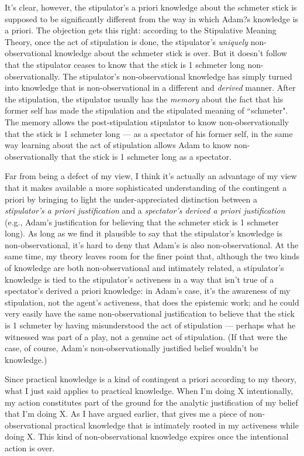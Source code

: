 \documentclass[a4paper,12pt]{article}
\begin{document}
It's clear, however, the stipulator's a priori knowledge about the schmeter stick is supposed to be significantly different from the way in which Adam?s knowledge is a priori. The objection gets this right: according to the Stipulative Meaning Theory, once the act of stipulation is done, the stipulator's \emph{uniquely} non-observational knowledge about the schmeter stick is over. But it doesn't follow that the stipulator ceases to know that the stick is 1 schmeter long non-observationally. The stipulator's non-observational knowledge has simply turned into knowledge that is non-observational in a different and \emph{derived} manner. After the stipulation, the stipulator usually has the \emph{memory} about the fact that his former self has made the stipulation and the stipulated meaning of ``schmeter". The memory allows the post-stipulation stipulator to know non-observationally that the stick is 1 schmeter long --- as a spectator of his former self, in the same way learning about the act of stipulation allows Adam to know non-observationally that the stick is 1 schmeter long as a spectator.

Far from being a defect of my view, I think it's actually an advantage of my view that it makes available a more sophisticated understanding of the contingent a priori by bringing to light the under-appreciated distinction between a \emph{stipulator's a priori justification} and a \emph{spectator's derived a priori justification} (e.g., Adam's justification for believing that the schmeter stick is 1 schmeter long). As long as we find it plausible to say that the stipulator's knowledge is non-observational, it's hard to deny that Adam's is also non-observational. At the same time, my theory leaves room for the finer point that, although the two kinds of knowledge are both non-observational and intimately related, a stipulator's knowledge is tied to the stipulator's activeness in a way that isn't true of a spectator's derived a priori knowledge: in Adam's case, it's the awareness of my stipulation, not the agent's activeness, that does the epistemic work; and he could very easily have the same non-observational justification to believe that the stick is 1 schmeter by having misunderstood the act of stipulation --- perhaps what he witnessed was part of a play, not a genuine act of stipulation. (If that were the case, of course, Adam's non-observationally justified belief wouldn't be knowledge.)

Since practical knowledge is a kind of contingent a priori according to my theory, what I just said applies to practical knowledge. When I'm doing X intentionally, my action constitutes part of the ground for the analytic justification of my belief that I'm doing X. As I have argued earlier, that gives me a piece of non-observational practical knowledge that is intimately rooted in my activeness while doing X. This kind of non-observational knowledge expires once the intentional action is over.
\end{document}
